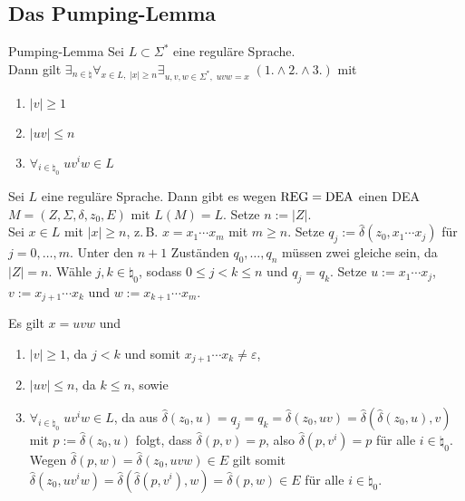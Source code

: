 \pagebreak

\subsection{%
    Das Pumping-Lemma%
}

\begin{Satz}{Pumping-Lemma}
    Sei $L \subset \Sigma^\ast$ eine reguläre Sprache.\\
    Dann gilt
    $\exists_{n \in \natural} \forall_{x \in L,\; |x| \ge n}
    \exists_{u, v, w \in \Sigma^\ast,\; uvw = x}\; (1. \land 2. \land 3.)$ mit
    \begin{enumerate}
        \item
        $|v| \ge 1$
        
        \item
        $|uv| \le n$
        
        \item
        $\forall_{i \in \natural_0}\; u v^i w \in L$
    \end{enumerate}
\end{Satz}

\begin{Beweis}
    Sei $L$ eine reguläre Sprache.
    Dann gibt es wegen $\text{REG} = \text{DEA}$ einen DEA\\
    $M = (Z, \Sigma, \delta, z_0, E)$ mit $L(M) = L$.
    Setze $n := |Z|$.\\
    Sei $x \in L$ mit $|x| \ge n$, z.\,B. $x = x_1 \dotsb x_m$ mit $m \ge n$.
    Setze $q_j := \widehat{\delta}(z_0, x_1 \dotsb x_j)$ für
    $j = 0, \dotsc, m$.
    Unter den $n + 1$ Zuständen $q_0, \dotsc, q_n$ müssen zwei gleiche sein,
    da $|Z| = n$.
    Wähle $j, k \in \natural_0$, sodass $0 \le j < k \le n$ und $q_j = q_k$.
    Setze $u := x_1 \dotsb x_j$, $v := x_{j+1} \dotsb x_k$ und
    $w := x_{k+1} \dotsb x_m$.
    
    Es gilt $x = uvw$ und
    \begin{enumerate}
        \item
        $|v| \ge 1$, da $j < k$ und somit
        $x_{j+1} \dotsb x_k \not= \varepsilon$,
        
        \item
        $|uv| \le n$, da $k \le n$, sowie
        
        \item
        $\forall_{i \in \natural_0}\; u v^i w \in L$, da aus
        $\widehat{\delta}(z_0, u) = q_j = q_k = \widehat{\delta}(z_0, uv) =
        \widehat{\delta}(\widehat{\delta}(z_0, u), v)$
        mit $p := \widehat{\delta}(z_0, u)$ folgt, dass
        $\widehat{\delta}(p, v) = p$,
        also $\widehat{\delta}(p, v^i) = p$ für alle $i \in \natural_0$.
        Wegen $\widehat{\delta}(p, w) = \widehat{\delta}(z_0, uvw) \in E$
        gilt somit $\widehat{\delta}(z_0, u v^i w) =
        \widehat{\delta}(\widehat{\delta}(p, v^i), w) =
        \widehat{\delta}(p, w) \in E$ für alle $i \in \natural_0$.
    \end{enumerate}
\end{Beweis}

